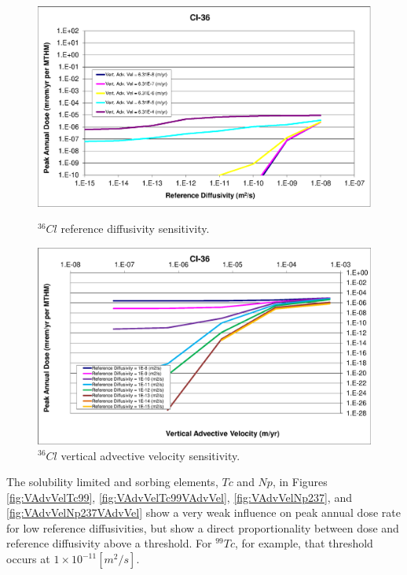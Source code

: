 \begin{figure}[htp!]
\begin{minipage}[b]{0.45\linewidth}

\includegraphics[width=\textwidth]{./chapters/nuclide_sensitivity/clay/AdvVelAndDiffCoeffEBSFail/Cl-36.eps}
\caption{$^{36}Cl$ reference diffusivity sensitivity.}
\label{fig:VAdvVelCl36}

\end{minipage}
\hspace{0.05\linewidth}
\begin{minipage}[b]{0.45\linewidth}

\includegraphics[width=\textwidth]{./chapters/nuclide_sensitivity/clay/AdvVelAndDiffCoeffEBSFail/Cl-36-VAdvVel.eps}
\caption{$^{36}Cl$ vertical advective velocity sensitivity.}
\label{fig:VAdvVelCl36VAdvVel}
\end{minipage}
\end{figure}

The solubility limited and sorbing elements, $Tc$ and $Np$, in Figures 
\ref{fig:VAdvVelTc99}, \ref{fig:VAdvVelTc99VAdvVel}, \ref{fig:VAdvVelNp237}, and 
\ref{fig:VAdvVelNp237VAdvVel} show a very weak influence on peak annual dose 
rate for low reference diffusivities, but show a direct proportionality between 
dose and reference diffusivity above a threshold. For $^{99}Tc$, for example, 
that threshold occurs at $1\times10^{-11}[m^2/s]$. 


